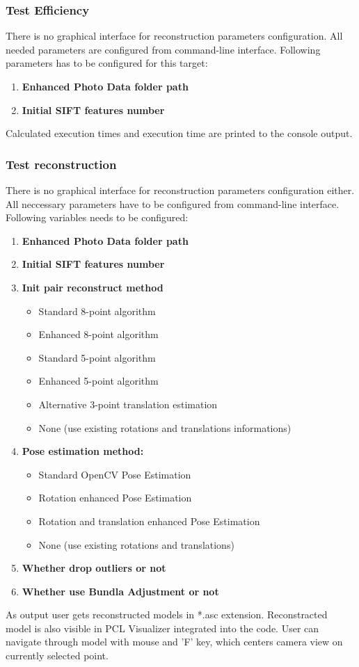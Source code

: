 \subsubsection{Test Efficiency}
There is no graphical interface for reconstruction parameters configuration. All needed parameters are configured from command-line interface. Following parameters has to be configured for this target:
\begin{enumerate}
\item \textbf{Enhanced Photo Data folder path}
\item \textbf{Initial SIFT features number}
\end{enumerate}
Calculated execution times and execution time are printed to the console output.
\subsubsection{Test reconstruction}
There is no graphical interface for reconstruction parameters configuration either. All neccessary parameters have to be configured from command-line interface. Following variables needs to be configured:
\begin{enumerate}
\item \textbf{Enhanced Photo Data folder path}
\item \textbf{Initial SIFT features number}
\item \textbf{Init pair reconstruct method}
\begin{itemize}
\item Standard 8-point algorithm
\item Enhanced 8-point algorithm
\item Standard 5-point algorithm
\item Enhanced 5-point algorithm
\item Alternative 3-point translation estimation
\item None (use existing rotations and translations informations)
\end{itemize}
\item \textbf{Pose estimation method:}
\begin{itemize}
\item Standard OpenCV Pose Estimation
\item Rotation enhanced Pose Estimation 
\item Rotation and translation enhanced Pose Estimation
\item None (use existing rotations and translations)
\end{itemize}
\item \textbf{Whether drop outliers or not}
\item \textbf{Whether use Bundla Adjustment or not}
\end{enumerate}
As output user gets reconstructed models in *.asc extension. Reconstracted model is also visible in PCL Visualizer integrated into the code. User can navigate through model with mouse and 'F' key, which centers camera view on currently selected point.
